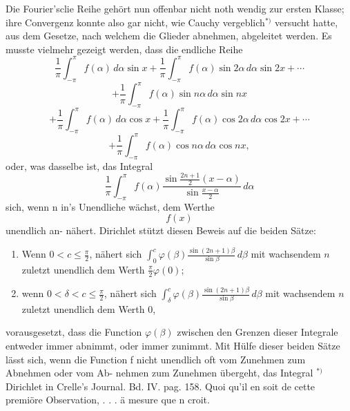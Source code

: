 \documentclass[12pt,a4paper]{book}
\theoremstyle{definition}
\theoremstyle{remark}
\begin{document}
Die  Fourier'sclie  Reihe  gehört  nun  offenbar  nicht  noth wendig
zur  ersten  Klasse;  ihre  Convergenz  konnte  also  gar  nicht,  wie  Cauchy
vergeblich$^{*)}$  versucht  hatte,  aus  dem  Gesetze,  nach  welchem  die  Glieder
abnehmen,  abgeleitet  werden.  Es  musste  vielmehr  gezeigt  werden,  dass
die  endliche  Reihe
\[
\frac{1}{\pi} \int_{-\pi}^{\pi} f(\alpha)\, d\alpha \sin x + \frac{1}{\pi} \int_{-\pi}^{\pi} f(\alpha) \sin 2\alpha\, d\alpha \sin 2x + \cdots
\]
\[
+ \frac{1}{\pi} \int_{-\pi}^{\pi} f(\alpha) \sin n\alpha\, d\alpha \sin nx
\]
\[
+ \frac{1}{\pi} \int_{-\pi}^{\pi} f(\alpha)\, d\alpha \cos x + \frac{1}{\pi} \int_{-\pi}^{\pi} f(\alpha) \cos 2\alpha\, d\alpha \cos 2x + \cdots
\]
\[
+ \frac{1}{\pi} \int_{-\pi}^{\pi} f(\alpha) \cos n\alpha\, d\alpha \cos nx,
\]
oder,  was  dasselbe  ist,  das  Integral
\[
\frac{1}{\pi} \int_{-\pi}^{\pi} f(\alpha) \frac{\sin \frac{2n+1}{2}(x-\alpha)}{\sin \frac{x-\alpha}{2}}\, d\alpha
\]
sich,  wenn  n  in's  Unendliche  wächst,  dem  Werthe  $$f(x)$$  unendlich  an-
nähert.
Dirichlet  stützt  diesen  Beweis  auf  die  beiden  Sätze:
\begin{enumerate}
\item Wenn $0 < c \leq \frac{\pi}{2}$, nähert sich $\int_0^c \varphi(\beta) \frac{\sin(2n+1)\beta}{\sin\beta}\, d\beta$ mit wachsendem $n$ zuletzt unendlich dem Werth $\frac{\pi}{2}\varphi(0)$;
\item wenn $0 < \delta < c \leq \frac{\pi}{2}$, nähert sich $\int_\delta^c \varphi(\beta) \frac{\sin(2n+1)\beta}{\sin\beta}\, d\beta$ mit wachsendem $n$ zuletzt unendlich dem Werth $0$,
\end{enumerate}
vorausgesetzt, dass die Function $\varphi(\beta)$ zwischen den Grenzen dieser Integrale entweder immer abnimmt, oder immer zunimmt.
Mit  Hülfe  dieser  beiden  Sätze  lässt  sich,  wenn  die  Function  f
nicht  unendlich  oft  vom  Zunehmen  zum  Abnehmen  oder  vom  Ab-
nehmen zum  Zunehmen  übergeht,  das  Integral
$^{*)}$  Dirichlet   in   Crelle's  Journal.     Bd.  IV.  pag.  158.     Quoi  qu'il  en  soit  de
cette  premiöre  Observation,  .  .  .  ä  mesure  que  n  croit.
\newpage
\end{document}
